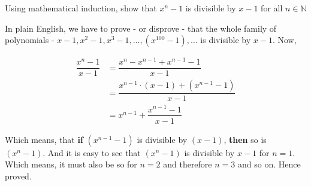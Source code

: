 
\question[3] Using mathematical induction, show that $x^n-1$ is divisible by $x-1$ for all $n\in\mathbb{N}$

\insertQR{}

\begin{solution}[\halfpage]
  In plain English, we have to prove - or disprove - that the whole family of polynomials
  - $x-1, x^2-1, x^3-1,\ldots, (x^{100}-1),\ldots$ is divisible by $x-1$. Now,

  \begin{align}
    \dfrac{x^n-1}{x-1} &= \dfrac{x^n - x^{n-1} + x^{n-1} - 1}{x-1} \\
                       &= \dfrac{x^{n-1}\cdot (x-1) + (x^{n-1} - 1)}{x - 1} \\
                       &= x^{n-1} + \dfrac{x^{n-1} - 1}{x-1}
  \end{align}
  
  Which means, that \textbf{if} $(x^{n-1}-1)$ is divisible by $(x-1)$, \textbf{then} so is $(x^n-1)$. 
  And it is easy to see that $(x^n-1)$ is divisible by $x-1$ for $n=1$. Which means, it must 
  also be so for $n=2$ and therefore $n=3$ and so on. Hence proved.
\end{solution}

